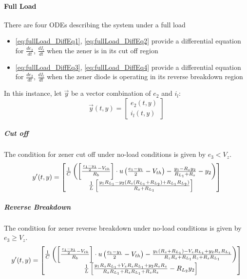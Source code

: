 \paragraph{Full Load}
There are four ODEs describing the system under a full load
\begin{itemize}
	\item \eqref{eq:fullLoad_DiffEq1}, \eqref{eq:fullLoad_DiffEq2} provide a differential equation for $\frac{de_2}{dt}$, $\frac{dI_l}{dt}$ when the zener is in its cut off region
	\item \eqref{eq:fullLoad_DiffEq3}, \eqref{eq:fullLoad_DiffEq4} provide a differential equation for $\frac{de_2}{dt}$, $\frac{dI_l}{dt}$ when the zener diode is operating in its reverse breakdown region
\end{itemize}
In this instance, let $\vec{y}$ be a vector combination of $e_2$ and $i_l$:
\begin{equation}
	\vec{y}(t,y) = \begin{bmatrix}
		e_2(t,y) \\
		i_l(t,y)
	\end{bmatrix}
\end{equation}
\subparagraph{Cut off}
The condition for zener cut off under no-load conditions is given by $e_3 < V_z$.
\begin{equation}
	y'(t,y) = \begin{bmatrix}
		 \frac{1}{C}\left(\left[\frac{\frac{e_1 - y_1}{2} - V_{th}}{R_b} \right]\cdot u\left(\frac{e_1 - y_1}{2} - V_{th} \right) - \frac{y_1 - R_s y_2}{R_{L_1} + R_s} - y_2 \right) \\
		 \frac{1}{L} \left[\frac{y_1R_{L_1} - y_2(R_s(R_{L_1}+R_{L_2}) + R_{L_1}R_{L_2})}{R_s + R_{L_1}} \right]
	\end{bmatrix}
\end{equation}
\subparagraph{Reverse Breakdown}
The condition for zener reverse breakdown under no-load conditions is given by $e_3 \geq V_z$.  
\begin{equation}
	y'(t,y) = \begin{bmatrix}
		 \frac{1}{C}\left(\left[\frac{\frac{e_1 - y_1}{2} - V_{th}}{R_b} \right]\cdot u\left(\frac{e_1 - y_1}{2} - V_{th} \right) - \frac{y_1 (R_z + R_{L_1}) - V_z R_{L_1} + y_2 R_z R_{L_1}}{R_z R_s + R_{L_1} R_z + R_s R_{L_1}} \right) \\
		 \frac{1}{L} \left[\frac{y_1 R_z R_{L_1} + V_z R_s R_{L_1} + y_2 R_s R_z}{R_z R_{L_1} + R_s R_{L_1} + R_s R_z} - R_{L_2}y_2 \right]
	\end{bmatrix}
\end{equation}